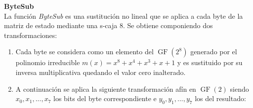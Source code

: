 \begin{description}
	\item \textbf{ByteSub}\\
		La función \emph{ByteSub} es una sustitución no lineal que se aplica a cada byte de la matriz de estado mediante una s-caja 8. Se obtiene componiendo dos transformaciones:
		\begin{enumerate}
			\item Cada byte se considera como un elemento del $\operatorname{GF}(2^8)$ generado por el polinomio irreducible $m(x)=x^8+x^4+x^3+x+1$ y es sustituido por su inversa multiplicativa quedando el valor cero inalterado. 
			\item A continuación se aplica la siguiente transformación afín en $\operatorname{GF}(2)$ siendo $x_0, x_1,...,x_7$ los bits del byte correspondiente e $y_0, y_1,...,y_7$ los del resultado:


\end{enumerate}
\end{description}
